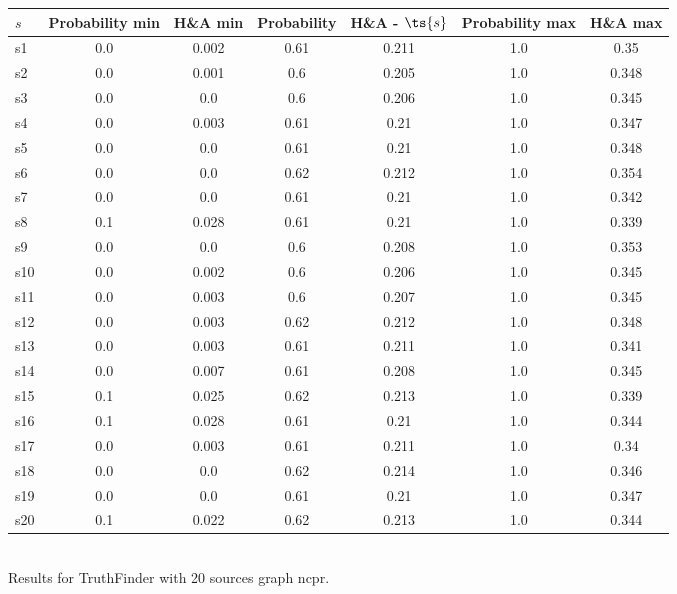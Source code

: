 \documentclass{article}
\begin{document}
\noindent\begin{tabular}{|l|c|c|c|c|c|c|}
\hline
$s$& Probability min & H\&A min & Probability & H\&A - $\ts{s}$ & Probability max & H\&A max\\
\hline
s1 &0.0 & 0.002 & 0.61 & 0.211 & 1.0 & 0.35\\
\hline
s2 &0.0 & 0.001 & 0.6 & 0.205 & 1.0 & 0.348\\
\hline
s3 &0.0 & 0.0 & 0.6 & 0.206 & 1.0 & 0.345\\
\hline
s4 &0.0 & 0.003 & 0.61 & 0.21 & 1.0 & 0.347\\
\hline
s5 &0.0 & 0.0 & 0.61 & 0.21 & 1.0 & 0.348\\
\hline
s6 &0.0 & 0.0 & 0.62 & 0.212 & 1.0 & 0.354\\
\hline
s7 &0.0 & 0.0 & 0.61 & 0.21 & 1.0 & 0.342\\
\hline
s8 &0.1 & 0.028 & 0.61 & 0.21 & 1.0 & 0.339\\
\hline
s9 &0.0 & 0.0 & 0.6 & 0.208 & 1.0 & 0.353\\
\hline
s10 &0.0 & 0.002 & 0.6 & 0.206 & 1.0 & 0.345\\
\hline
s11 &0.0 & 0.003 & 0.6 & 0.207 & 1.0 & 0.345\\
\hline
s12 &0.0 & 0.003 & 0.62 & 0.212 & 1.0 & 0.348\\
\hline
s13 &0.0 & 0.003 & 0.61 & 0.211 & 1.0 & 0.341\\
\hline
s14 &0.0 & 0.007 & 0.61 & 0.208 & 1.0 & 0.345\\
\hline
s15 &0.1 & 0.025 & 0.62 & 0.213 & 1.0 & 0.339\\
\hline
s16 &0.1 & 0.028 & 0.61 & 0.21 & 1.0 & 0.344\\
\hline
s17 &0.0 & 0.003 & 0.61 & 0.211 & 1.0 & 0.34\\
\hline
s18 &0.0 & 0.0 & 0.62 & 0.214 & 1.0 & 0.346\\
\hline
s19 &0.0 & 0.0 & 0.61 & 0.21 & 1.0 & 0.347\\
\hline
s20 &0.1 & 0.022 & 0.62 & 0.213 & 1.0 & 0.344\\
\hline
\end{tabular}\\

\noindent Results for TruthFinder with 20 sources graph ncpr.
\end{document}
